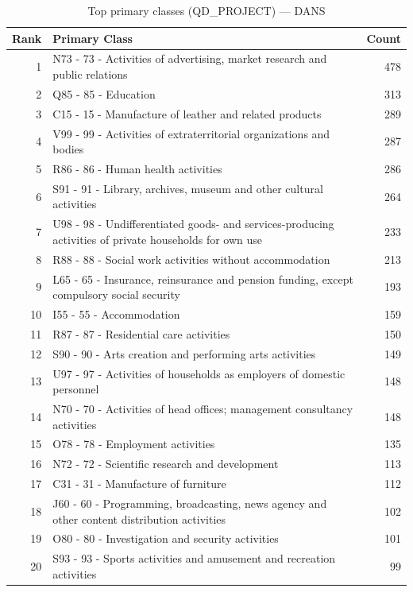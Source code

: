 \begin{table}[H]
    \centering
    \begin{tabular}{r p{10cm} r}
    \hline
    \textbf{Rank} & \textbf{Primary Class} & \textbf{Count} \\
    \hline
    1 & N73 - 73 - Activities of advertising, market research and public relations & 478 \\
    2 & Q85 - 85 - Education & 313 \\
    3 & C15 - 15 - Manufacture of leather and related products & 289 \\
    4 & V99 - 99 - Activities of extraterritorial organizations and bodies & 287 \\
    5 & R86 - 86 - Human health activities & 286 \\
    6 & S91 - 91 - Library, archives, museum and other cultural activities & 264 \\
    7 & U98 - 98 - Undifferentiated goods- and services-producing activities of private households for own use & 233 \\
    8 & R88 - 88 - Social work activities without accommodation & 213 \\
    9 & L65 - 65 - Insurance, reinsurance and pension funding, except compulsory social security & 193 \\
    10 & I55 - 55 - Accommodation & 159 \\
    11 & R87 - 87 - Residential care activities & 150 \\
    12 & S90 - 90 - Arts creation and performing arts activities & 149 \\
    13 & U97 - 97 - Activities of households as employers of domestic personnel & 148 \\
    14 & N70 - 70 - Activities of head offices; management consultancy activities & 148 \\
    15 & O78 - 78 - Employment activities & 135 \\
    16 & N72 - 72 - Scientific research and development & 113 \\
    17 & C31 - 31 - Manufacture of furniture & 112 \\
    18 & J60 - 60 - Programming, broadcasting, news agency and other content distribution activities & 102 \\
    19 & O80 - 80 - Investigation and security activities & 101 \\
    20 & S93 - 93 - Sports activities and amusement and recreation activities & 99 \\
    \hline
    \end{tabular}
    \caption{Top primary classes (QD\_PROJECT) --- DANS}
\end{table}

